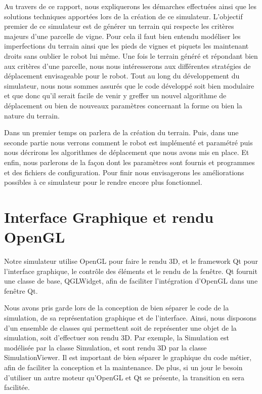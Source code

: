 \documentclass[usenames,dvipsnames]{report}
\begin{document}
    Au travers de ce rapport, nous expliquerons les démarches effectuées ainsi que les solutions techniques apportées lors de la création de ce simulateur.
    L’objectif premier de ce simulateur est de générer un terrain qui respecte les critères majeurs d’une parcelle de vigne. Pour cela il faut bien entendu modéliser les imperfections du terrain ainsi que les pieds de vignes et piquets les maintenant droits sans oublier le robot lui même. Une fois le terrain généré et répondant bien aux critères d’une parcelle, nous nous intéresserons aux différentes stratégies de déplacement envisageable pour le robot.
    Tout au long du développement du simulateur, nous nous sommes assurés que le code développé soit bien modulaire et que donc qu’il serait facile de venir y greffer un nouvel algorithme de déplacement ou bien de nouveaux paramètres concernant la forme ou bien la nature du terrain.


    Dans un premier temps on parlera de la création du terrain. Puis, dans une seconde partie nous verrons comment le robot est implémenté et paramétré puis nous décrirons les algorithmes de déplacement que nous avons mis en place. Et enfin, nous parlerons de la façon dont les paramètres sont fournis et programmes et des fichiers de configuration. Pour finir nous envisagerons les améliorations possibles à ce simulateur pour le rendre encore plus fonctionnel.

    \chapter{Interface Graphique et rendu OpenGL}

    Notre simulateur utilise OpenGL pour faire le rendu 3D, et le framework Qt pour l’interface graphique, le contrôle des éléments et le rendu de la fenêtre.
    Qt fournit une classe de base, QGLWidget, afin de faciliter l’intégration d’OpenGL dans une fenêtre Qt.


    Nous avons pris garde lors de la conception de bien séparer le code de la simulation, de sa représentation graphique et de l’interface. Ainsi, nous disposons d’un ensemble de classes qui permettent soit de représenter une objet de la simulation, soit d’effectuer son rendu 3D.
    Par exemple, la Simulation est modélisée par la classe Simulation, et sont rendu 3D par la classe SimulationViewer. Il est important de bien séparer le graphique du code métier, afin de faciliter la conception et la maintenance. De plus, si un jour le besoin d’utiliser un autre moteur qu’OpenGL et Qt se présente, la transition en sera facilitée.
\end{document}
